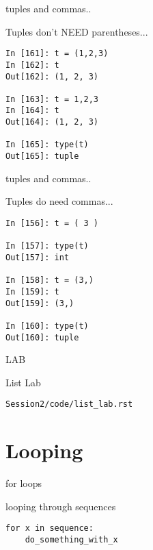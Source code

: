 \documentclass{beamer}
\begin{document}
\begin{frame}[fragile]{tuples and commas..}

{\Large  Tuples don't NEED parentheses... }

\begin{verbatim}
In [161]: t = (1,2,3)
In [162]: t
Out[162]: (1, 2, 3)

In [163]: t = 1,2,3
In [164]: t
Out[164]: (1, 2, 3)

In [165]: type(t)
Out[165]: tuple
\end{verbatim}

\end{frame}

\begin{frame}[fragile]{tuples and commas..}

{\Large  Tuples do need commas... }

\begin{verbatim}
In [156]: t = ( 3 )

In [157]: type(t)
Out[157]: int

In [158]: t = (3,)
In [159]: t
Out[159]: (3,)

In [160]: type(t)
Out[160]: tuple
\end{verbatim}

\end{frame}


\begin{frame}[fragile]{LAB}

\vfill
{\LARGE List Lab}

\vfill
\verb|Session2/code/list_lab.rst|

\vfill

\end{frame}


\section{Looping}

\begin{frame}[fragile]{for loops}

{\Large looping through sequences

\begin{verbatim}
for x in sequence:
    do_something_with_x
\end{verbatim}
}
\end{frame}
\end{document}
